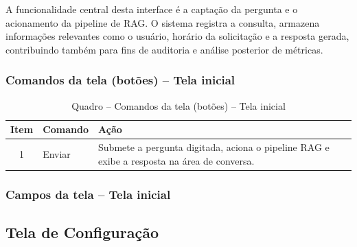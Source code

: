 A funcionalidade central desta interface é a captação da pergunta e o acionamento da pipeline de RAG. O sistema registra a consulta, armazena informações relevantes como o usuário, horário da solicitação e a resposta gerada, contribuindo também para fins de auditoria e análise posterior de métricas.

\subsubsection{Comandos da tela (botões) – Tela inicial}

\begin{table}[H]
  \centering
  \caption{Quadro – Comandos da tela (botões) – Tela inicial}
  \label{tab:cmd_tela_inicial}
  \begin{tabular}{|c|p{4cm}|p{8cm}|}
    \hline
    \textbf{Item} & \textbf{Comando} & \textbf{Ação} \\ \hline
    1 & Enviar & Submete a pergunta digitada, aciona o pipeline RAG e exibe a resposta na área de conversa. \\ \hline
  \end{tabular}
\end{table}


\subsubsection{Campos da tela – Tela inicial}


\begin{table}[H]
  \centering
  \caption{Quadro 1 – Campos da tela – Tela Inicial}
  \label{tab:campos_tela_inicial}
  \vspace{0.2cm}
\end{table}

\subsection{Tela de Configuração}
\label{subsec:tela_configuracao}

